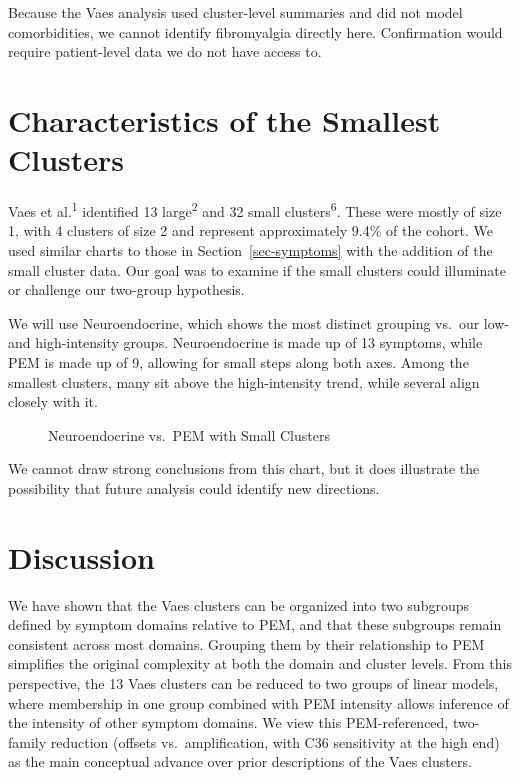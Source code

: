 \documentclass[
  letterpaper,
  DIV=11,
  numbers=noendperiod]{scrartcl}
\begin{document}
Because the Vaes analysis used cluster-level summaries and did not model
comorbidities, we cannot identify fibromyalgia directly here.
Confirmation would require patient-level data we do not have access to.

\section{Characteristics of the Smallest Clusters}\label{sec-small}

\FloatBarrier

Vaes et al.\textsuperscript{1} identified 13 large\textsuperscript{2}
and 32 small clusters\textsuperscript{6}. These were mostly of size 1,
with 4 clusters of size 2 and represent approximately 9.4\% of the
cohort. We used similar charts to those in Section~\ref{sec-symptoms}
with the addition of the small cluster data. Our goal was to examine if
the small clusters could illuminate or challenge our two-group
hypothesis.

We will use Neuroendocrine, which shows the most distinct grouping
vs.~our low- and high-intensity groups. Neuroendocrine is made up of 13
symptoms, while PEM is made up of 9, allowing for small steps along both
axes. Among the smallest clusters, many sit above the high-intensity
trend, while several align closely with it.

\begin{figure}[h]


\caption{\label{fig-smallest}Neuroendocrine vs.~PEM with Small Clusters}

\end{figure}%

We cannot draw strong conclusions from this chart, but it does
illustrate the possibility that future analysis could identify new
directions.

\FloatBarrier

\section{Discussion}\label{sec-discuss}

We have shown that the Vaes clusters can be organized into two subgroups
defined by symptom domains relative to PEM, and that these subgroups
remain consistent across most domains. Grouping them by their
relationship to PEM simplifies the original complexity at both the
domain and cluster levels. From this perspective, the 13 Vaes clusters
can be reduced to two groups of linear models, where membership in one
group combined with PEM intensity allows inference of the intensity of
other symptom domains. We view this PEM-referenced, two-family reduction
(offsets vs.~amplification, with C36 sensitivity at the high end) as the
main conceptual advance over prior descriptions of the Vaes clusters.
\end{document}

